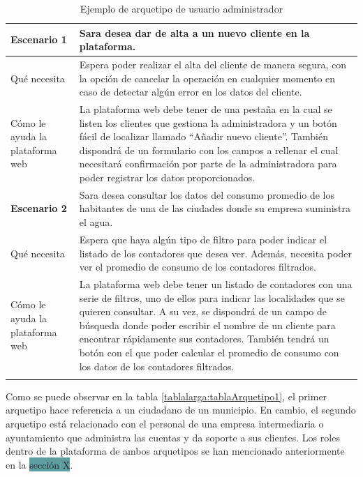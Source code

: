 \documentclass[pdftex,11pt,a4paper]{book}
\begin{document}
\begin{center}
\begin{longtable}{|m{3cm}|m{11cm}|}
\hline

\textbf{Escenario 1} & Sara desea dar de alta a un nuevo cliente en la plataforma.
\\ \hline
Qué necesita & Espera poder realizar el alta del cliente de manera segura, con la opción de cancelar la operación en cualquier momento en caso de detectar algún error en los datos del cliente.
\\ \hline
\raggedright{Cómo le ayuda la \mbox{plataforma} web} & La plataforma web debe tener de una pestaña en la cual se listen los clientes que gestiona la administradora y un botón fácil de localizar llamado “Añadir nuevo cliente”. \break \break
También dispondrá de un formulario con los campos a rellenar el cual necesitará confirmación por parte de la administradora para poder registrar los datos proporcionados.
\\ \hline
\textbf{Escenario 2} & Sara desea consultar los datos del consumo promedio de los habitantes de una de las ciudades donde su empresa suministra el agua.    
\\ \hline
Qué necesita & Espera que haya algún tipo de filtro para poder indicar el listado de los contadores que desea ver.
Además, necesita poder ver el promedio de consumo de los contadores filtrados.
\\ \hline
\raggedright{Cómo le ayuda la \mbox{plataforma} web} & La plataforma web debe tener un listado de contadores con una serie de filtros, uno de ellos para indicar las localidades que se quieren consultar. \break \break
A su vez, se dispondrá de un campo de búsqueda donde poder escribir el nombre de un cliente para encontrar rápidamente sus contadores. \break \break
También tendrá un botón con el que poder calcular el promedio de consumo con los datos de los contadores filtrados.
\\ \hline
\caption{Ejemplo de arquetipo de usuario administrador} \label{tablalarga:tablaArquetipo2}
\end{longtable}
\end{center}
\vspace{-1,5cm}

Como se puede observar en la tabla \ref{tablalarga:tablaArquetipo1}, el primer arquetipo hace referencia a un ciudadano de un municipio. En cambio, el segundo arquetipo está relacionado con el personal de una empresa intermediaria o ayuntamiento que administra las cuentas y da soporte a sus clientes. Los roles dentro de la plataforma de ambos arquetipos se han mencionado anteriormente en la \colorbox{CadetBlue}{sección X}.
\end{document}
